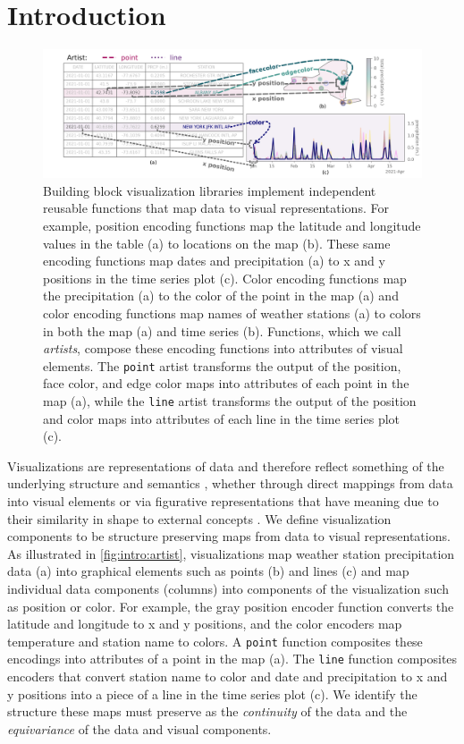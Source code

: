\documentclass[../main.tex]{subfiles}
\begin{document}
\section{Introduction}
\label{sec:intro}
\begin{figure}[h]
    \includegraphics[width=1\textwidth]{figures/intro/functions.png}
    \caption{Building block visualization libraries implement independent reusable functions that map data to visual representations. For example, position encoding functions map the latitude and longitude values in the table (a) to locations on the map (b). These same encoding functions map dates and precipitation (a) to x and y positions in the time series plot (c). Color encoding functions map the precipitation (a) to the color of the point in the map (a) and color encoding functions map names of weather stations (a) to colors in both the map (a) and time series (b). Functions, which we call \textit{artists}, compose these encoding functions into attributes of visual elements. The \texttt{point} artist transforms the output of the position, face color, and edge color maps into attributes of each point in the map (a), while the \texttt{line} artist transforms the output of the position and color maps into attributes of each line in the time series plot (c).}
    \label{fig:intro:artist}
\end{figure}

Visualizations are representations of data and therefore reflect something of the underlying structure and semantics \cite{friendlyBriefHistoryData2008}, whether through direct mappings from data into visual elements or via figurative representations that have meaning due to their similarity in shape to external concepts \cite{byrneAcquiredCodesMeaning2016}. We define visualization components to be structure preserving maps from data to visual representations. As illustrated in \autoref{fig:intro:artist}, visualizations map weather station precipitation data (a) into graphical elements such as points (b) and lines (c) and map individual data components (columns) into components of the visualization such as position or color. For example, the gray position encoder function converts the latitude and longitude to x and y positions, and the color encoders map temperature and station name to colors. A \texttt{point} function composites these encodings into attributes of a point in the map (a). The \texttt{line} function composites encoders that convert station name to color and date and precipitation to x and y positions into a piece of a line in the time series plot (c). We identify the structure these maps must preserve as the \textit{continuity} of the data and the \textit{equivariance} of the data and visual components. 
\end{document}
